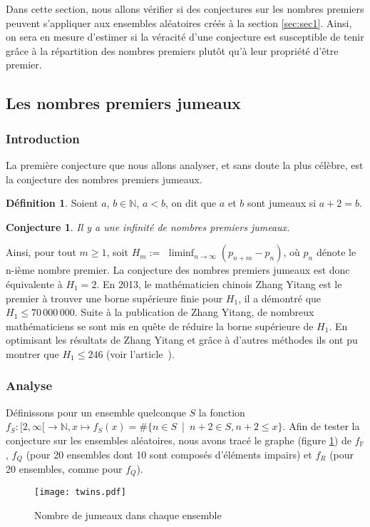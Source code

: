 \documentclass[../main.tex]{subfiles}
\begin{document}
\theoremstyle{definition}
\newtheorem{Def}{Définition}

\theoremstyle{plain}
\newtheorem{Conj}{Conjecture}

    \label{sec:test2}
    Dans cette section, nous allons vérifier si des conjectures sur les nombres premiers peuvent s'appliquer aux ensembles aléatoires créés à la section \ref{sec:sec1}. Ainsi, on sera en mesure d'estimer si la véracité d'une conjecture est susceptible de tenir grâce à la répartition des nombres premiers plutôt qu'à leur propriété d'être premier. 
 
 \subsection{Les nombres premiers jumeaux} 
 \subsubsection{Introduction}
 	La première conjecture que nous allons analyser, et sans doute la plus célèbre, est la conjecture des nombres premiers jumeaux.
	\begin{Def}
	Soient $a$, $b \in \mathbb{N} $, $ a < b$, on dit que $a$ et $b$ sont jumeaux si $ a + 2 = b $.
	\end{Def}  
	
	\begin{Conj}
	\label{conj:twinprimes}
	Il y a une infinité de nombres premiers jumeaux.
	\end{Conj}
	
	Ainsi, pour tout $ m \geqslant 1$, soit $H_{m} := $ $\liminf_{n \rightarrow \infty}  (p_{n+m} - p_{n})$, où $p_{n}$ dénote le n-ième nombre premier. La conjecture des nombres premiers jumeaux est donc équivalente à $H_{1} = 2$. En 2013, le mathématicien chinois Zhang Yitang est le premier à trouver une borne supérieure finie pour $H_{1}$, il a démontré que $H_{1} \leqslant 70\, 000\, 000$. Suite à la publication de Zhang Yitang, de nombreux mathématiciens se sont mis en quête de réduire la borne supérieure de $H_{1}$. En optimisant les résultats de Zhang Yitang et grâce à d'autres méthodes ils ont pu montrer que $H_{1} \leqslant 246$ (voir l'article~\cite{article_polymath}).

\subsubsection{Analyse}
	Définissons pour un ensemble quelconque $S$ la fonction $f_{S} : [2, \infty [ \rightarrow \mathbb{N}, x \mapsto f_{S}(x) = \# \{ n \in S$~|~$ n+2 \in S, n+2 \leqslant x \}$. 
	Afin de tester la conjecture sur les ensembles aléatoires, nous avons tracé le graphe (figure \ref{im:image4}) de $f_{\mathbb{P}}$, $f_{Q}$ (pour 20 ensembles dont 10 sont composés d'éléments impairs) et $f_{R}$ (pour 20 ensembles, comme pour $f_{Q}$).
\begin{figure}[H]
 \centering
 \texttt{[image: twins.pdf]}
 \caption{Nombre de jumeaux dans chaque ensemble}
 \label{im:image4}
 \end{figure}
 
\end{document}
